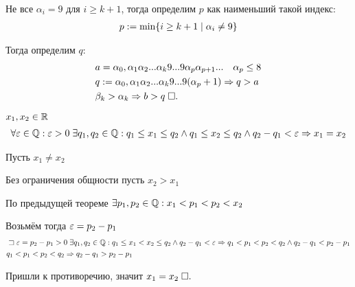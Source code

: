 \documentclass{article}
\begin{document}
Не все $\alpha_{i}=9$ для $i\geq k+1$, тогда определим $p$ как наименьший такой индекс:
\begin{align*}
	p:=\min\setdef{i\geq k+1}{\alpha_{i}\neq 9}
\end{align*}

Тогда определим $q$:
\begin{align*}
	 & a=\alpha_0,\alpha_1\alpha_2...\alpha_{k}9...9\alpha_{p}\alpha_{p+1}...\quad \alpha_{p}\leq 8 \\
	 & q:=\alpha_0,\alpha_1\alpha_2...\alpha_{k}9...9(\alpha_{p}+1)\Rarr q>a                        \\
	 & \beta_{k}>\alpha_{k}\Rarr b>q\qed
\end{align*}

\theorem

$x_1,x_2\in\R$
\begin{align*}
	\forall\eps\in\Q:\eps>0\;\exists q_1,q_2\in\Q:q_1\leq x_1\leq q_2\land q_1\leq x_2\leq q_2\land q_2-q_1<\eps\Rarr x_1=x_2
\end{align*}

\proof

Пусть $x_1\neq x_2$

Без ограничения общности пусть $x_2>x_1$

По предыдущей теореме $\exists p_1,p_2\in\Q:x_1<p_1<p_2<x_2$

Возьмём тогда $\eps=p_2-p_1$
\begin{align*}
	 & \llet \eps=p_2-p_1>0\;\exists q_1,q_2\in\Q:q_1\leq x_1<x_2\leq q_2\land q_2-q_1<\eps\Rarr q_1<p_1<p_2<q_2\land q_2-q_1<p_2-p_1 \\
	 & q_1<p_1<p_2<q_2\Rarr q_2-q_1>p_2-p_1
\end{align*}

Пришли к противоречию, значит $x_1=x_2\qed$
\end{document}
